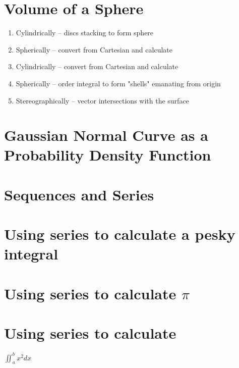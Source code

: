 \documentclass{article}
\begin{document}
\section{Volume of a Sphere}
\begin{enumerate}
	\item Cylindrically -- discs stacking to form sphere
	\item Spherically -- convert from Cartesian and calculate
	\item Cylindrically -- convert from Cartesian and calculate
	\item Spherically -- order integral to form "shells" emanating from origin
	\item Stereographically -- vector intersections with the surface
\end{enumerate}

\section{Gaussian Normal Curve as a Probability Density Function}

\section{Sequences and Series}

\section{Using series to calculate a pesky integral}

\section{Using series to calculate $\pi$}

\section{Using series to calculate}

$\iint_{a}^{b} x^2 dx$
\end{document}
